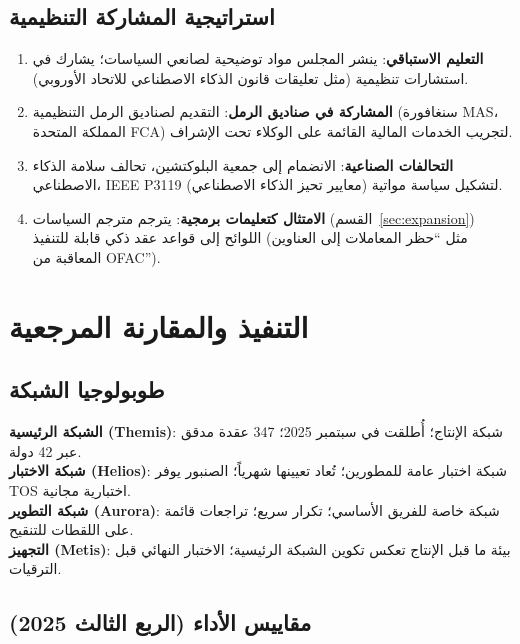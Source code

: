 \documentclass[11pt]{article}
\begin{document}
\subsection{استراتيجية المشاركة التنظيمية}

\begin{enumerate}[noitemsep]
  \item \textbf{التعليم الاستباقي}: ينشر المجلس مواد توضيحية لصانعي السياسات؛ يشارك في استشارات تنظيمية (مثل تعليقات قانون الذكاء الاصطناعي للاتحاد الأوروبي).
  \item \textbf{المشاركة في صناديق الرمل}: التقديم لصناديق الرمل التنظيمية (سنغافورة MAS، المملكة المتحدة FCA) لتجريب الخدمات المالية القائمة على الوكلاء تحت الإشراف.
  \item \textbf{التحالفات الصناعية}: الانضمام إلى جمعية البلوكتشين، تحالف سلامة الذكاء الاصطناعي، IEEE P3119 (معايير تحيز الذكاء الاصطناعي) لتشكيل سياسة مواتية.
  \item \textbf{الامتثال كتعليمات برمجية}: يترجم مترجم السياسات (القسم~\ref{sec:expansion}) اللوائح إلى قواعد عقد ذكي قابلة للتنفيذ (مثل ``حظر المعاملات إلى العناوين المعاقبة من OFAC'').
\end{enumerate}

\section{التنفيذ والمقارنة المرجعية}
\label{sec:implementation}

\subsection{طوبولوجيا الشبكة}

\textbf{الشبكة الرئيسية (Themis)}: شبكة الإنتاج؛ أُطلقت في سبتمبر 2025؛ 347 عقدة مدقق عبر 42 دولة.\\
\textbf{شبكة الاختبار (Helios)}: شبكة اختبار عامة للمطورين؛ تُعاد تعيينها شهرياً؛ الصنبور يوفر TOS اختبارية مجانية.\\
\textbf{شبكة التطوير (Aurora)}: شبكة خاصة للفريق الأساسي؛ تكرار سريع؛ تراجعات قائمة على اللقطات للتنقيح.\\
\textbf{التجهيز (Metis)}: بيئة ما قبل الإنتاج تعكس تكوين الشبكة الرئيسية؛ الاختبار النهائي قبل الترقيات.

\subsection{مقاييس الأداء (الربع الثالث 2025)}
\end{document}
